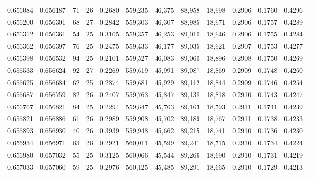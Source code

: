 \begin{tabular}{rrrrrrrrrrrrr}
0.656084 & 0.656187 &  71 &  26 &                                     0.2680 & 559,235 &  46,375 &  88,958 &  18,998 & 0.2906 & 0.1760 & 0.4296 \\
0.656200 & 0.656301 &  68 &  27 &                                     0.2842 & 559,303 &  46,307 &  88,985 &  18,971 & 0.2906 & 0.1757 & 0.4289 \\
0.656312 & 0.656361 &  54 &  25 &                                     0.3165 & 559,357 &  46,253 &  89,010 &  18,946 & 0.2906 & 0.1755 & 0.4284 \\
0.656362 & 0.656397 &  76 &  25 &                                     0.2475 & 559,433 &  46,177 &  89,035 &  18,921 & 0.2907 & 0.1753 & 0.4277 \\
0.656398 & 0.656532 &  94 &  25 &                                     0.2101 & 559,527 &  46,083 &  89,060 &  18,896 & 0.2908 & 0.1750 & 0.4269 \\
0.656533 & 0.656624 &  92 &  27 &                                     0.2269 & 559,619 &  45,991 &  89,087 &  18,869 & 0.2909 & 0.1748 & 0.4260 \\
0.656625 & 0.656684 &  62 &  25 &                                     0.2874 & 559,681 &  45,929 &  89,112 &  18,844 & 0.2909 & 0.1746 & 0.4254 \\
0.656687 & 0.656759 &  82 &  26 &                                     0.2407 & 559,763 &  45,847 &  89,138 &  18,818 & 0.2910 & 0.1743 & 0.4247 \\
0.656767 & 0.656821 &  84 &  25 &                                     0.2294 & 559,847 &  45,763 &  89,163 &  18,793 & 0.2911 & 0.1741 & 0.4239 \\
0.656821 & 0.656886 &  61 &  26 &                                     0.2989 & 559,908 &  45,702 &  89,189 &  18,767 & 0.2911 & 0.1738 & 0.4233 \\
0.656893 & 0.656930 &  40 &  26 &                                     0.3939 & 559,948 &  45,662 &  89,215 &  18,741 & 0.2910 & 0.1736 & 0.4230 \\
0.656934 & 0.656971 &  63 &  26 &                                     0.2921 & 560,011 &  45,599 &  89,241 &  18,715 & 0.2910 & 0.1734 & 0.4224 \\
0.656980 & 0.657032 &  55 &  25 &                                     0.3125 & 560,066 &  45,544 &  89,266 &  18,690 & 0.2910 & 0.1731 & 0.4219 \\
0.657033 & 0.657060 &  59 &  25 &                                     0.2976 & 560,125 &  45,485 &  89,291 &  18,665 & 0.2910 & 0.1729 & 0.4213 \\

\end{tabular}
